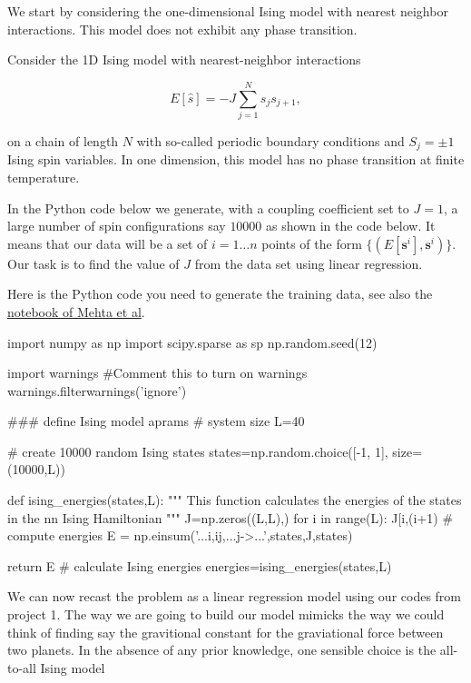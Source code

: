 \documentclass[%
oneside,                 %
final,                   %
10pt]{article}
\begin{document}
We start by considering the one-dimensional Ising model with nearest neighbor interactions. This model does not exhibit any phase transition.

Consider the 1D Ising model with nearest-neighbor interactions 

\begin{equation*}
  E[\hat{s}]=-J\sum_{j=1}^{N}s_{j}s_{j+1},
\end{equation*}

on a chain of length $N$ with so-called periodic boundary conditions and $S_j=\pm 1$ Ising spin variables.
In one dimension, this model has no phase transition at finite temperature.

In the Python code below we generate, with a coupling coefficient set to $J=1$, a large number of spin configurations say $10000$ as shown in the code below.
It means that our data will be a set of $i=1\ldots n$ points of the form
$\{(E[\boldsymbol{s}^i],\boldsymbol{s}^i)\}$.
Our task is to find the value of $J$ from the data set using linear regression.

Here is the Python code you need to generate the training data, see
also the \href{{https://physics.bu.edu/~pankajm/ML-Notebooks/HTML/NB_CVI-linreg_ising.html}}{notebook of Mehta et
al}.

\bpycod
import numpy as np
import scipy.sparse as sp
np.random.seed(12)

import warnings
#Comment this to turn on warnings
warnings.filterwarnings('ignore')

### define Ising model aprams
# system size
L=40

# create 10000 random Ising states
states=np.random.choice([-1, 1], size=(10000,L))

def ising_energies(states,L):
    """
    This function calculates the energies of the states in the nn Ising Hamiltonian
    """
    J=np.zeros((L,L),)
    for i in range(L):
        J[i,(i+1)%
    # compute energies
    E = np.einsum('...i,ij,...j->...',states,J,states)

    return E
# calculate Ising energies
energies=ising_energies(states,L)
\epycod

We can now recast the problem as a linear regression model using our codes from project 1.
The way we are going to build our model mimicks the way we could think of finding say the gravitional constant for the graviational force between two planets.
In the absence of any prior knowledge, one sensible choice is the all-to-all Ising model
\end{document}
